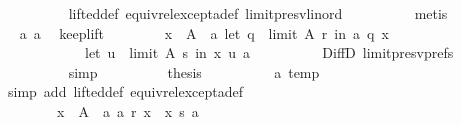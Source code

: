 \begin{isabellebody}
\ \ \ \ \ \ \ \ \isamarkupfalse%
\ lifted{\isacharunderscore}{\kern0pt}def\ equiv{\isacharunderscore}{\kern0pt}rel{\isacharunderscore}{\kern0pt}except{\isacharunderscore}{\kern0pt}a{\isacharunderscore}{\kern0pt}def\ limit{\isacharunderscore}{\kern0pt}presv{\isacharunderscore}{\kern0pt}lin{\isacharunderscore}{\kern0pt}ord\isanewline
\ \ \ \ \ \ \ \ \isamarkupfalse%
\ metis\isanewline
\ \ \ \ \ \ \isamarkupfalse%
\ \isamarkupfalse%
\ a{}\ a{}{\isacharunderscore}{\kern0pt}{}\ \isamarkupfalse%
\ keep{\isacharunderscore}{\kern0pt}lift{\isacharcolon}{\kern0pt}\isanewline
\ \ \ \ \ \ \ \ {\isachardoublequoteopen}{\isasymexists}x\ {\isasymin}\ A\ {\isacharminus}{\kern0pt}\ {\isacharbraceleft}{\kern0pt}a{\isacharbraceright}{\kern0pt}{\isachardot}{\kern0pt}\ {\isacharparenleft}{\kern0pt}let\ q\ {\isacharequal}{\kern0pt}\ limit\ A\ r\ in\ a\ {\isasympreceq}\isactrlsub q\ x{\isacharparenright}{\kern0pt}\ {\isasymand}\isanewline
\ \ \ \ \ \ \ \ \ \ \ \ {\isacharparenleft}{\kern0pt}let\ u\ {\isacharequal}{\kern0pt}\ limit\ A\ s\ in\ x\ {\isasympreceq}\isactrlsub u\ a{\isacharparenright}{\kern0pt}{\isachardoublequoteclose}\isanewline
\ \ \ \ \ \ \ \ \isamarkupfalse%
\ DiffD{}\ limit{\isacharunderscore}{\kern0pt}presv{\isacharunderscore}{\kern0pt}prefs{}\isanewline
\ \ \ \ \ \ \ \ \isamarkupfalse%
\ simp\isanewline
\ \ \ \ \ \ \isamarkupfalse%
\ \isamarkupfalse%
\ {\isacharquery}{\kern0pt}thesis\isanewline
\ \ \ \ \ \ \ \ \isamarkupfalse%
\ a{}\ temp\isanewline
\ \ \ \ \ \ \ \ \isamarkupfalse%
\ {\isacharparenleft}{\kern0pt}simp\ add{\isacharcolon}{\kern0pt}\ lifted{\isacharunderscore}{\kern0pt}def\ equiv{\isacharunderscore}{\kern0pt}rel{\isacharunderscore}{\kern0pt}except{\isacharunderscore}{\kern0pt}a{\isacharunderscore}{\kern0pt}def{\isacharparenright}{\kern0pt}\isanewline
\ \ \ \ \isamarkupfalse%
\isanewline
\ \ \ \ \ \ \isamarkupfalse%
\isanewline
\ \ \ \ \ \ \ \ {\isachardoublequoteopen}{\isasymnot}{\isacharparenleft}{\kern0pt}{\isasymexists}x\ {\isasymin}\ A\ {\isacharminus}{\kern0pt}\ {\isacharbraceleft}{\kern0pt}a{\isacharbraceright}{\kern0pt}{\isachardot}{\kern0pt}\ a\ {\isasympreceq}\isactrlsub r\ x\ {\isasymand}\ x\ {\isasympreceq}\isactrlsub s\ a{\isacharparenright}{\kern0pt}{\isachardoublequoteclose}\ \isanewline
\ \ \ \ \ \ \isamarkupfalse%

\end{isabellebody}
